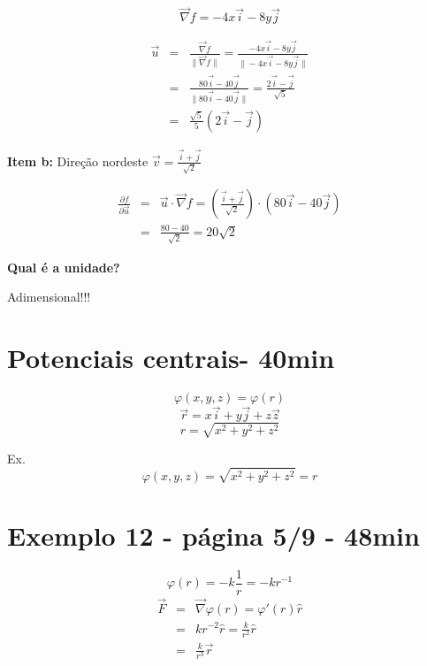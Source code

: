 \documentclass[a4paper,10pt]{book}
\begin{document}
$$\vec{\nabla}f = -4x\vec{i} -8y\vec{j}$$

\begin{eqnarray*}\vec{u}&=&\frac{\vec{\nabla}f}{\|\vec{\nabla}f\|}=\frac{-4x\vec{i} -8y\vec{j}}{\|-4x\vec{i} -8y\vec{j}\|}\\
&=&\frac{80\vec{i} -40\vec{j}}{\|80\vec{i} -40\vec{j}\|}= \frac{2\vec{i}-\vec{j}}{\sqrt{5}}\\
&=&\frac{\sqrt{5}}{5}\left(2\vec{i}-\vec{j}\right)
\end{eqnarray*}


{\bf Item b:} Direção nordeste $\vec{v}=\frac{\vec{i}+\vec{j}}{\sqrt{2}}$


\begin{eqnarray*}\frac{\partial f}{\partial \vec{u}}&=&\vec{u}\cdot\vec{\nabla}f=\left(\frac{\vec{i}+\vec{j}}{\sqrt{2}}\right)\cdot\left(80\vec{i}-40\vec{j}\right)\\
&=&\frac{80-40}{\sqrt{2}}=20\sqrt{2}
\end{eqnarray*}
\begin{center}{\bf \huge Qual é a unidade?}\end{center}
Adimensional!!!


\section{Potenciais centrais- 40min}
$$\varphi(x,y,z) = \varphi(r)$$
$$\vec{r}=x\vec{i}+y\vec{j}+z\vec{z}$$
$${r}=\sqrt{x^2+y^2+z^2}$$

Ex.
$$\varphi(x,y,z) = \sqrt{x^2+y^2+z^2}=r$$

\section{Exemplo 12 - página 5/9 - 48min}

$$\varphi(r)=-k\frac{1}{r}=-kr^{-1}$$
\begin{eqnarray*}\vec{F}&=&\vec{\nabla}\varphi(r)=\varphi'(r)\hat{r}\\
&=&kr^{-2}\hat{r}= \frac{k}{r^2}\hat{r}\\&=&\frac{k}{r^3}\vec{r}
\end{eqnarray*}


\section{}
\end{document}
